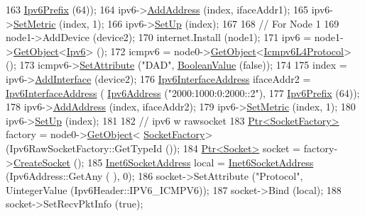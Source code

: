 \begin{DoxyCode}
163                                                           \hyperlink{classns3_1_1Ipv6Prefix}{Ipv6Prefix} (64));
164   ipv6->\hyperlink{classns3_1_1Ipv6_a5cd576e83cf65445be3a0b5ffd1ddc5c}{AddAddress} (index, ifaceAddr1);
165   ipv6->\hyperlink{classns3_1_1Ipv6_ab8dfd51c931ebc11c107bff673bae827}{SetMetric} (index, 1);
166   ipv6->\hyperlink{classns3_1_1Ipv6_a8e61d85ec7fd342ed38fef2d040ed1b9}{SetUp} (index);
167 
168   \textcolor{comment}{// For Node 1}
169   node1->AddDevice (device2);
170   internet.Install (node1);
171   ipv6 = node1->\hyperlink{classns3_1_1Object_a13e18c00017096c8381eb651d5bd0783}{GetObject}<\hyperlink{classns3_1_1Ipv6}{Ipv6}> ();
172   icmpv6 = node0->\hyperlink{classns3_1_1Object_a13e18c00017096c8381eb651d5bd0783}{GetObject}<\hyperlink{classns3_1_1Icmpv6L4Protocol}{Icmpv6L4Protocol}> ();
173   icmpv6->\hyperlink{classns3_1_1ObjectBase_ac60245d3ea4123bbc9b1d391f1f6592f}{SetAttribute} (\textcolor{stringliteral}{"DAD"}, \hyperlink{classns3_1_1BooleanValue}{BooleanValue} (\textcolor{keyword}{false}));
174 
175   index = ipv6->\hyperlink{classns3_1_1Ipv6_a4fd7da82c16b8abf9ca15f982918e6a4}{AddInterface} (device2);
176   \hyperlink{classns3_1_1Ipv6InterfaceAddress}{Ipv6InterfaceAddress} ifaceAddr2 = \hyperlink{classns3_1_1Ipv6InterfaceAddress}{Ipv6InterfaceAddress} (
      \hyperlink{classns3_1_1Ipv6Address}{Ipv6Address} (\textcolor{stringliteral}{"2000:1000:0:2000::2"}),
177                                                           \hyperlink{classns3_1_1Ipv6Prefix}{Ipv6Prefix} (64));
178   ipv6->\hyperlink{classns3_1_1Ipv6_a5cd576e83cf65445be3a0b5ffd1ddc5c}{AddAddress} (index, ifaceAddr2);
179   ipv6->\hyperlink{classns3_1_1Ipv6_ab8dfd51c931ebc11c107bff673bae827}{SetMetric} (index, 1);
180   ipv6->\hyperlink{classns3_1_1Ipv6_a8e61d85ec7fd342ed38fef2d040ed1b9}{SetUp} (index);
181 
182   \textcolor{comment}{// ipv6 w rawsocket}
183   \hyperlink{classns3_1_1Ptr}{Ptr<SocketFactory>} factory = node0->\hyperlink{classns3_1_1Object_a13e18c00017096c8381eb651d5bd0783}{GetObject}<
      \hyperlink{classns3_1_1SocketFactory}{SocketFactory}> (Ipv6RawSocketFactory::GetTypeId ());
184   \hyperlink{classns3_1_1Ptr}{Ptr<Socket>} socket = factory->\hyperlink{classns3_1_1SocketFactory_a97351e6e7860503a4912042530449f62}{CreateSocket} ();
185   \hyperlink{classns3_1_1Inet6SocketAddress}{Inet6SocketAddress} local =  \hyperlink{classns3_1_1Inet6SocketAddress}{Inet6SocketAddress} (Ipv6Address::GetAny (
      ), 0);
186   socket->SetAttribute (\textcolor{stringliteral}{"Protocol"}, UintegerValue (Ipv6Header::IPV6\_ICMPV6));
187   socket->Bind (local);
188   socket->SetRecvPktInfo (\textcolor{keyword}{true});

\end{DoxyCode}
